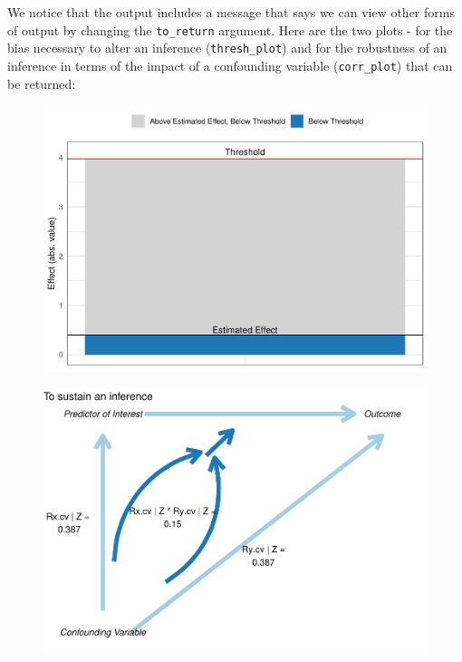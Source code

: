 \documentclass[man]{apa6}
\theoremstyle{definition}
\theoremstyle{definition}
\theoremstyle{definition}
\theoremstyle{remark}
\begin{document}
We notice that the output includes a message that says we can view other
forms of output by changing the \texttt{to\_return} argument. Here are
the two plots - for the bias necessary to alter an inference
(\texttt{thresh\_plot}) and for the robustness of an inference in terms
of the impact of a confounding variable (\texttt{corr\_plot}) that can
be returned:

\begin{figure}
\centering
\includegraphics{papaja_files/figure-latex/unnamed-chunk-5-1.pdf}
\caption{}
\end{figure}

\begin{figure}
\centering
\includegraphics{papaja_files/figure-latex/unnamed-chunk-6-1.pdf}
\caption{}
\end{figure}
\end{document}

